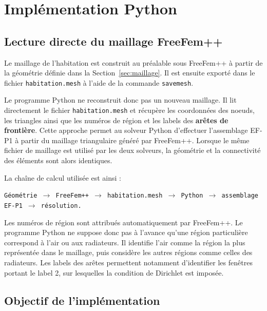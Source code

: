 \documentclass[12pt,a4paper]{article}
\begin{document}
	\section{Implémentation Python}
	\label{sec:python}
	
	\subsection{Lecture directe du maillage FreeFem++}
	
	Le maillage de l'habitation est construit au préalable sous FreeFem++ à
	partir de la géométrie définie dans la Section~\ref{sec:maillage}. Il est
	ensuite exporté dans le fichier \texttt{habitation.mesh} à l'aide de la
	commande \texttt{savemesh}.
	
	Le programme Python ne reconstruit donc pas un nouveau maillage. Il lit
	directement le fichier \texttt{habitation.mesh} et récupère les coordonnées
	des noeuds, les triangles ainsi que les numéros de région et les labels des
	\textbf{arêtes de frontière}. Cette approche permet au solveur Python d'effectuer l'assemblage EF-P1
	à partir du maillage triangulaire généré par FreeFem++. Lorsque le même
	fichier de maillage est utilisé par les deux solveurs, la géométrie et la
	connectivité des éléments sont alors identiques.
	
	La chaîne de calcul utilisée est ainsi :
	\begin{center}
		\texttt{Géométrie $\rightarrow$ FreeFem++ $\rightarrow$ habitation.mesh
			$\rightarrow$ Python $\rightarrow$ assemblage EF-P1 $\rightarrow$ résolution.}
	\end{center}
	
	Les numéros de région sont attribués automatiquement par FreeFem++. Le
	programme Python ne suppose donc pas à l'avance qu'une région particulière
	correspond à l'air ou aux radiateurs. Il identifie l'air comme la région
	la plus représentée dans le maillage, puis considère les autres régions
	comme celles des radiateurs. Les labels des arêtes permettent notamment
	d'identifier les fenêtres portant le label 2, sur lesquelles la condition
	de Dirichlet est imposée.
	
	
	
	
	\subsection{Objectif de l'implémentation}
	
\end{document}
